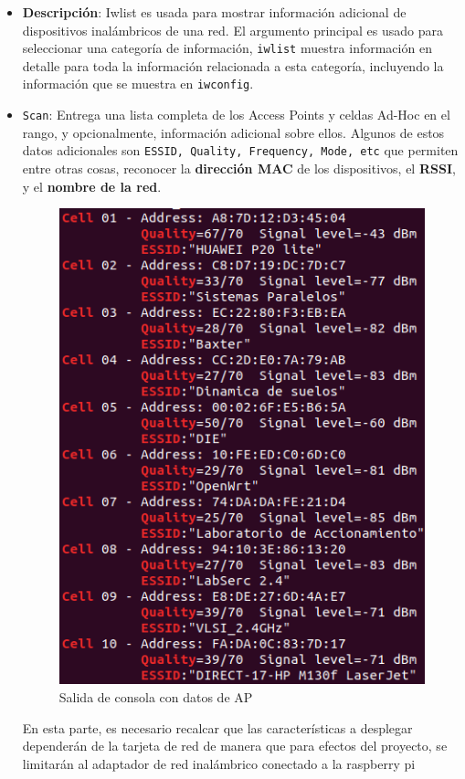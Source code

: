 \begin{itemize}
    \item{\textbf{Descripción}: Iwlist es usada para mostrar información adicional de dispositivos inalámbricos de una red. El argumento principal es usado para seleccionar una categoría de información, \texttt{iwlist} muestra información en detalle para toda la información relacionada a esta categoría, incluyendo la información que se muestra en \texttt{iwconfig}.}
    
    \item {\texttt{Scan}: Entrega una lista completa de los Access Points y celdas Ad-Hoc en el rango, y opcionalmente, información adicional sobre ellos. Algunos de estos datos adicionales son \texttt{ESSID, Quality, Frequency, Mode, etc} que permiten entre otras cosas, reconocer la \textbf{dirección MAC} de los dispositivos, el \textbf{RSSI}, y el \textbf{nombre de la red}.
    
    \begin{figure}[h!]
        \centering
        \includegraphics[scale=0.5]{./images/output}
        \caption{Salida de consola con datos de AP}
        \label{fig:output}
    \end{figure}
    
    En esta parte, es necesario recalcar que las características a desplegar dependerán de la tarjeta de red de manera que para efectos del proyecto, se limitarán al adaptador de red inalámbrico conectado a la raspberry pi}
\end{itemize}

